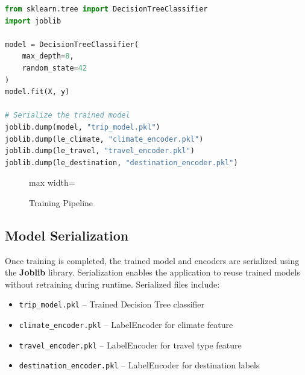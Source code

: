 \begin{lstlisting}[language=Python, caption={Decision Tree Training Code}, label={lst:training}]
from sklearn.tree import DecisionTreeClassifier
import joblib

model = DecisionTreeClassifier(
    max_depth=8,
    random_state=42
)
model.fit(X, y)

# Serialize the trained model
joblib.dump(model, "trip_model.pkl")
joblib.dump(le_climate, "climate_encoder.pkl")
joblib.dump(le_travel, "travel_encoder.pkl")
joblib.dump(le_destination, "destination_encoder.pkl")
\end{lstlisting}

\begin{figure}[H]
    \centering
    \begin{adjustbox}{max width=\textwidth}
    \end{adjustbox}
    \caption{Training Pipeline}
    \label{fig:training-pipeline}
\end{figure}

\subsection{Model Serialization}

Once training is completed, the trained model and encoders are serialized using the \textbf{Joblib} library. Serialization enables the application to reuse trained models without retraining during runtime. Serialized files include:

\begin{itemize}
    \item \texttt{trip\_model.pkl} -- Trained Decision Tree classifier
    \item \texttt{climate\_encoder.pkl} -- LabelEncoder for climate feature
    \item \texttt{travel\_encoder.pkl} -- LabelEncoder for travel type feature
    \item \texttt{destination\_encoder.pkl} -- LabelEncoder for destination labels
\end{itemize}

